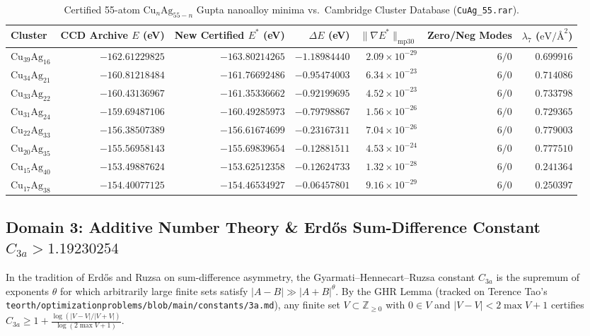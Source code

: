 \documentclass[11pt,a4paper]{article}
\begin{document}
\begin{table}[htbp]
\centering
\caption{Certified 55-atom $\text{Cu}_n\text{Ag}_{55-n}$ Gupta nanoalloy minima vs.\ Cambridge Cluster Database (\texttt{CuAg\_55.rar}).}
\label{tab:gupta}
\small
\begin{tabular}{@{}lrrrrrr@{}}
\toprule
\textbf{Cluster} & \textbf{CCD Archive $E$ (eV)} & \textbf{New Certified $E^*$ (eV)} & \textbf{$\Delta E$ (eV)} & \textbf{$\|\nabla E^*\|_{\text{mp30}}$} & \textbf{Zero/Neg Modes} & \textbf{$\lambda_7$ ($\text{eV/\AA}^2$)} \\
\midrule
$\text{Cu}_{39}\text{Ag}_{16}$ & $-162.61229825$ & $\mathbf{-163.80214265}$ & $\mathbf{-1.18984440}$ & $2.09 \times 10^{-29}$ & $6 / 0$ & $0.699916$ \\
$\text{Cu}_{34}\text{Ag}_{21}$ & $-160.81218484$ & $\mathbf{-161.76692486}$ & $\mathbf{-0.95474003}$ & $6.34 \times 10^{-23}$ & $6 / 0$ & $0.714086$ \\
$\text{Cu}_{33}\text{Ag}_{22}$ & $-160.43136967$ & $\mathbf{-161.35336662}$ & $\mathbf{-0.92199695}$ & $4.52 \times 10^{-23}$ & $6 / 0$ & $0.733798$ \\
$\text{Cu}_{31}\text{Ag}_{24}$ & $-159.69487106$ & $\mathbf{-160.49285973}$ & $\mathbf{-0.79798867}$ & $1.56 \times 10^{-26}$ & $6 / 0$ & $0.729365$ \\
$\text{Cu}_{22}\text{Ag}_{33}$ & $-156.38507389$ & $\mathbf{-156.61674699}$ & $\mathbf{-0.23167311}$ & $7.04 \times 10^{-26}$ & $6 / 0$ & $0.779003$ \\
$\text{Cu}_{20}\text{Ag}_{35}$ & $-155.56958143$ & $\mathbf{-155.69839654}$ & $\mathbf{-0.12881511}$ & $4.53 \times 10^{-24}$ & $6 / 0$ & $0.777510$ \\
$\text{Cu}_{15}\text{Ag}_{40}$ & $-153.49887624$ & $\mathbf{-153.62512358}$ & $\mathbf{-0.12624733}$ & $1.32 \times 10^{-28}$ & $6 / 0$ & $0.241364$ \\
$\text{Cu}_{17}\text{Ag}_{38}$ & $-154.40077125$ & $\mathbf{-154.46534927}$ & $\mathbf{-0.06457801}$ & $9.16 \times 10^{-29}$ & $6 / 0$ & $0.250397$ \\
\bottomrule
\end{tabular}
\end{table}

\subsection{Domain 3: Additive Number Theory \& Erd\H{o}s Sum-Difference Constant $C_{3a} > 1.19230254$}
In the tradition of Erd\H{o}s and Ruzsa on sum-difference asymmetry, the Gyarmati--Hennecart--Ruzsa constant $C_{3a}$ is the supremum of exponents $\theta$ for which arbitrarily large finite sets satisfy $|A-B| \gg |A+B|^\theta$. By the GHR Lemma (tracked on Terence Tao's \texttt{teorth/optimizationproblems/blob/main/constants/3a.md}), any finite set $V \subset \mathbb{Z}_{\ge 0}$ with $0 \in V$ and $|V-V| < 2\max V + 1$ certifies $C_{3a} \ge 1 + \frac{\log(|V-V|/|V+V|)}{\log(2\max V + 1)}$.
\end{document}
